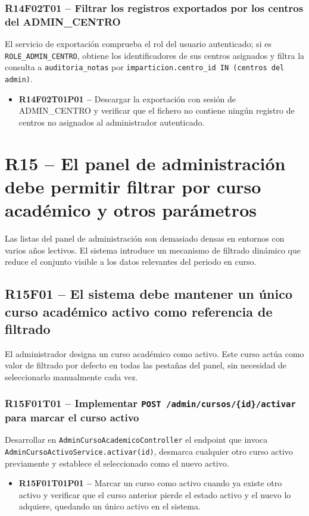 \documentclass[12pt, a4paper]{report}
\begin{document}
\subsubsection{R14F02T01 -- Filtrar los registros exportados por los centros del ADMIN\_CENTRO}
El servicio de exportación comprueba el rol del usuario autenticado; si es \texttt{ROLE\_ADMIN\_CENTRO}, obtiene los identificadores de sus centros asignados y filtra la consulta a \texttt{auditoria\_notas} por \texttt{imparticion.centro\_id IN (centros del admin)}.
\begin{itemize}
  \item \textbf{R14F02T01P01 --} Descargar la exportación con sesión de ADMIN\_CENTRO y verificar que el fichero no contiene ningún registro de centros no asignados al administrador autenticado.
\end{itemize}

\section{R15 -- El panel de administración debe permitir filtrar por curso académico y otros parámetros}

Las listas del panel de administración son demasiado densas en entornos con varios años lectivos. El sistema introduce un mecanismo de filtrado dinámico que reduce el conjunto visible a los datos relevantes del periodo en curso.

\subsection{R15F01 -- El sistema debe mantener un único curso académico activo como referencia de filtrado}

El administrador designa un curso académico como activo. Este curso actúa como valor de filtrado por defecto en todas las pestañas del panel, sin necesidad de seleccionarlo manualmente cada vez.

\subsubsection{R15F01T01 -- Implementar \texttt{POST /admin/cursos/\{id\}/activar} para marcar el curso activo}
Desarrollar en \texttt{AdminCursoAcademicoController} el endpoint que invoca \texttt{AdminCursoActivoService.activar(id)}, desmarca cualquier otro curso activo previamente y establece el seleccionado como el nuevo activo.
\begin{itemize}
  \item \textbf{R15F01T01P01 --} Marcar un curso como activo cuando ya existe otro activo y verificar que el curso anterior pierde el estado activo y el nuevo lo adquiere, quedando un único activo en el sistema.
\end{itemize}
\end{document}
